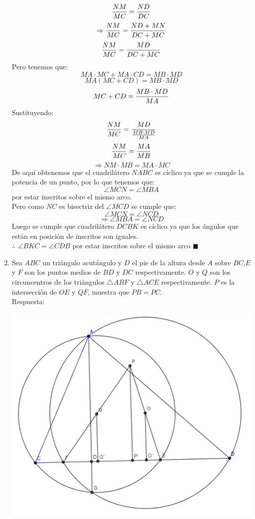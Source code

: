 \documentclass{book}
\begin{document}
\begin{enumerate}
          $${NM\over MC}={ND\over DC}$$
          $$\Rightarrow{NM\over MC}={ND+MN\over DC+MC}$$
          $${NM\over MC}={MD\over DC+MC}$$
          Pero tenemos que:
          $$MA\cdot MC + MA\cdot CD = MB\cdot MD$$
          $$MA( MC+CD) = MB\cdot MD$$
          $$MC+CD={ MB\cdot MD\over MA}$$
          Sustituyendo:
          $${NM\over MC}=\frac{MD}{{MB\cdot MD\over MA}}$$
          $${NM\over MC}={MA\over MB}$$
          $$\Rightarrow NM\cdot MB=MA\cdot MC$$
          De aquí obtenemos que el cuadrilátero $NABC$ es cíclico ya que se cumple la potencia de un punto, por lo que tenemos que:
          $$\angle MCN=\angle MBA$$
          por estar inscritos sobre el mismo arco.\\
          Pero como $NC$ es bisectriz del $\angle MCD$ se cumple que:
          $$\angle MCN=\angle NCD$$
          $$\Rightarrow \angle MBA=\angle NCD$$
          Luego se cumple que cuadrilátero $DCBK$ es cíclico ya que los ángulos que están en posición de inscritos son iguales.\\
          $\therefore$ $\angle BKC=\angle CDB$ por estar inscritos sobre el mismo arco $\blacksquare$\\
    \item Sea $ABC$ un triángulo acutángulo y $D$ el pie de la altura desde $A$ sobre $BC$,$E$ y $F$ son los puntos medios de $BD$ y $DC$ respectivamente. $O$ y $Q$ son los circuncentros de los triángulos $\triangle ABF$ y $\triangle ACE$ respectivamente. $P$ es la intersección de $OE$ y $QF$, muestra que $PB=PC$. \\
          Respuesta:
          \begin{center}
              \includegraphics[scale=1]{imagenes/Geometria/12.png}

\end{center}
\end{enumerate}
\end{document}
